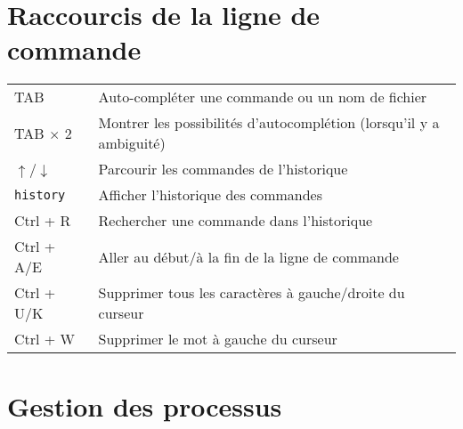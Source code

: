 \documentclass [a4paper]{article}
\begin{document}
\section*{Raccourcis de la ligne de commande}

\noindent
\begin{tabular}{ ll }
\hline
TAB                                 & Auto-compléter une commande ou un nom de fichier \\
TAB $\times$ 2                      & Montrer les possibilités d'autocomplétion (lorsqu'il y a ambiguité) \\
{$\uparrow$/$\downarrow$}           & Parcourir les commandes de l'historique \\
\verb+history+                      & Afficher l'historique des commandes \\
{Ctrl + R}                          & Rechercher une commande dans l'historique \\
{Ctrl + A/E}                        & Aller au début/à la fin de la ligne de commande \\
{Ctrl + U/K}                        & Supprimer tous les caractères à gauche/droite du curseur \\
{Ctrl + W}                          & Supprimer le mot à gauche du curseur \\
\hline
\end{tabular}


\section*{Gestion des processus}
\end{document}

